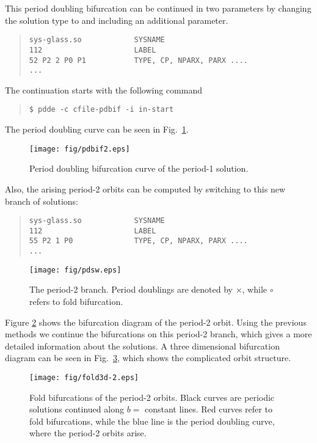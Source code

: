 \documentclass[10pt,a4paper]{ddedoc}
\begin{document}
This period doubling bifurcation can be continued in two parameters 
by changing the solution type to  and including an additional parameter.
{ \small \begin{quote} \begin{lstlisting}[basicstyle=\tt,frame=single]
sys-glass.so            SYSNAME
112                     LABEL
52 P2 2 P0 P1           TYPE, CP, NPARX, PARX ....
...
\end{lstlisting} \end{quote} } \noindent
The continuation starts with the following command
{ \small \begin{quote} \begin{lstlisting}[basicstyle=\tt,frame=single]
$ pdde -c cfile-pdbif -i in-start
\end{lstlisting} \end{quote} } \noindent
The period doubling curve can be seen in Fig.\ \ref{pdbif}.
\begin{figure}
\begin{center}
\texttt{[image: fig/pdbif2.eps]}
\end{center}
\caption{Period doubling bifurcation curve of the period-1 solution.}
\label{pdbif}
\end{figure}
Also, the arising period-2 orbits can be computed by switching to this new branch of solutions:
{ \small \begin{quote} \begin{lstlisting}[basicstyle=\tt,frame=single]
sys-glass.so            SYSNAME
112                     LABEL
55 P2 1 P0              TYPE, CP, NPARX, PARX ....
...
\end{lstlisting} \end{quote} } \noindent
%
\begin{figure}
\begin{center}
\texttt{[image: fig/pdsw.eps]}
\end{center}
\caption{The period-2 branch. Period doublings are denoted by $\times$, while $\circ$ refers to fold bifurcation. }
\label{pdsw}
\end{figure}
Figure \ref{pdsw} shows the bifurcation diagram of the period-2 orbit. Using the previous methods we continue the bifurcations on this period-2 branch, which gives a more detailed information about the solutions. A three dimensional bifurcation diagram can be seen in Fig.\ \ref{pdfold}, which shows the complicated orbit structure.
\begin{figure}
\begin{center}
\texttt{[image: fig/fold3d-2.eps]}
\end{center}
\caption{Fold bifurcations of the period-2 orbits. Black curves are periodic solutions continued along $b=$ constant lines. Red curves refer to fold bifurcations, while the blue line is the period doubling curve, where the period-2 orbits arise. }
\label{pdfold}
\end{figure}
\end{document}
